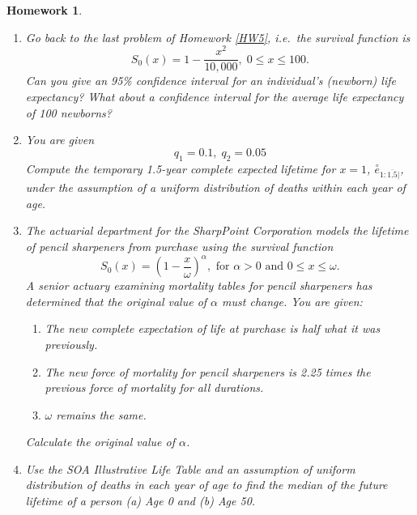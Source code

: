 \documentclass[11pt,fleqn,oneside]{book}
\newtheorem{homework}{Homework}
\begin{document}
\begin{homework}
\label{HW7}
\begin{enumerate}
\item Go back to the last problem of Homework \ref{HW5}, i.e.\ the survival function is 
$$
S_0(x) = 1 - \frac{x^2}{10,000},\;0\leq x \leq 100.
$$
Can you give an 95\% confidence interval for an individual's (newborn) life expectancy? What about a confidence interval for the average life expectancy of 100 newborns?
\item You are given
$$
q_1 = 0.1, \; q_2=0.05
$$
Compute the temporary 1.5-year complete expected lifetime for $x=1$, $\stackrel{\circ}{e}_{1:\overline{1.5}|}$, under the assumption of a uniform distribution of deaths within each year of age.
\item The actuarial department for the SharpPoint Corporation models the lifetime of pencil sharpeners from purchase using the survival function
$$
S_0(x) = \left(1 - \frac{x}{\omega}\right)^{\alpha}, \text{ for }\alpha >0 \text{ and } 0 \leq x \leq \omega.
$$
A senior actuary examining mortality tables for pencil sharpeners has determined that the original value of $\alpha$ must change. You are given:
\begin{enumerate}
\item The new complete expectation of life at purchase is half what it was previously.
\item The new force of mortality for pencil sharpeners is 2.25 times the previous force of mortality for all durations.
\item $\omega$ remains the same.
\end{enumerate}
Calculate the original value of $\alpha$.
\item Use the SOA Illustrative Life Table and an assumption of uniform distribution of deaths in each year of age to find the median of the future lifetime of a person (a) Age 0 and (b) Age 50. 
\end{enumerate}
\end{homework} 
\end{document}
